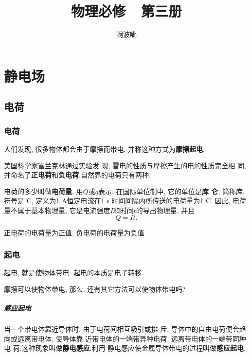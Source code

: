 \documentclass[12pt,a4paper]{ctexart}
\title{物理必修\ \ 第三册}
\author{啊波呲}
\newcounter{exam}[section]
\begin{document}
\maketitle
{}
\tableofcontents

\newpage
{}

\setlength{\abovedisplayskip}{3pt}
\setlength{\belowdisplayskip}{3pt}

\section{静电场}


\subsection{电荷}
\subsubsection{电荷}

人们发现, 很多物体都会由于摩擦而带电, 并称这种方式为\textbf{摩擦起电}.

美国科学家富兰克林通过实验发
现, 雷电的性质与摩擦产生的电的性质完全相
同, 并命名了\textbf{正电荷}和\textbf{负电荷}.自然界的电荷只有两种.

电荷的多少叫做\textbf{电荷量}, 用$Q$或$q$表示. 在国际单位制中, 它的单位是\textbf{库
    仑}, 简称库, 符号是 C, 定义为1 A恒定电流在1 s 时间间隔内所传送的电荷量为1 C. 因此,
电荷量不属于基本物理量, 它是电流强度$I$和时间$t$的导出物理量, 并且$$Q = It.$$

正电荷的电荷量为正值, 负电荷的电荷量为负值.

\subsubsection{起电}

起电, 就是使物体带电. 起电的本质是电子转移.

摩擦可以使物体带电, 那么, 还有其它方法可以使物体带电吗?

\subparagraph{感应起电} 当一个带电体靠近导体时, 由于电荷间相互吸引或排
斥, 导体中的自由电荷便会趋向或远离带电体, 使导体靠
近带电体的一端带异种电荷, 远离带电体的一端带同种电
荷.这种现象叫做\textbf{静电感应}.利用
静电感应使金属导体带电的过程叫做\textbf{感应起电}.
\end{document}
